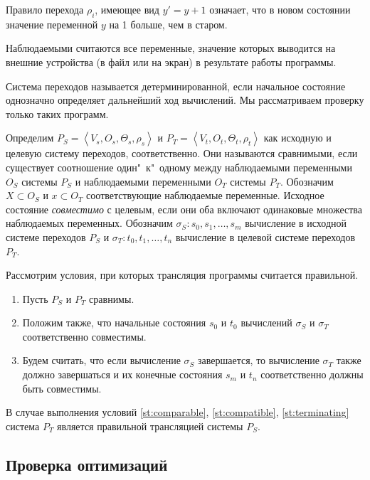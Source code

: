 Правило перехода $\rho_i$, имеющее вид $y' = y + 1$ означает, что в новом состоянии значение переменной $y$ на 1 больше, чем в старом.

Наблюдаемыми считаются все переменные, значение которых выводится на внешние устройства (в файл или на экран) в результате работы программы.

Система переходов называется детерминированной, если начальное состояние однозначно определяет дальнейший ход вычислений. Мы рассматриваем проверку только таких программ.

Определим $P_{S} = \left\langle  V_{s}, O_{s}, \Theta_{s}, \rho_{s} \right\rangle $ и $P_{T} = \left\langle  V_{t}, O_{t}, \Theta_{t}, \rho_{t} \right\rangle $ как исходную и целевую систему переходов, соответственно. 
Они называются сравнимыми, если существует соотношение один"~к"~одному между наблюдаемыми переменными $O_{S}$ системы $P_{S}$ и наблюдаемыми переменными $O_{T}$ системы $P_{T}$. 
Обозначим $ X \subset O_{S} $ и $ x \subset O_{T} $ соответствующие наблюдаемые переменные. 
Исходное состояние \emph{совместимо} с целевым, если они оба включают одинаковые множества наблюдаемых переменных. Обозначим $\sigma_{S}: s_{0}, s_{1}, \ldots, s_{m}$ вычисление в исходной системе переходов $P_{S}$ и $\sigma_{T}: t_{0}, t_{1}, \ldots, t_{n}$ вычисление в целевой системе переходов $P_{T}$. 

{
    Рассмотрим условия, при которых трансляция программы считается правильной.
    \begin{enumerate}
        \item {Пусть $P_{S}$ и $P_{T}$ сравнимы. \label{st:comparable}}
        \item {Положим также, что начальные состояния $s_{0}$ и $t_{0}$ вычислений $\sigma_{S}$ и $\sigma_{T}$ соответственно совместимы. \label{st:compatible}}
        \item {Будем считать, что если вычисление $\sigma_{S}$ завершается, то вычисление $\sigma_{T}$ также должно завершаться и их конечные состояния $s_{m}$ и $t_{n}$ соответственно должны быть совместимы. \label{st:terminating}}
    \end{enumerate}
    
    В случае выполнения условий \ref{st:comparable}, \ref{st:compatible}, \ref{st:terminating} система $P_{T}$ является правильной трансляцией системы $P_{S}$.
}

\subsection{Проверка оптимизаций}
\label{ss:validate}

